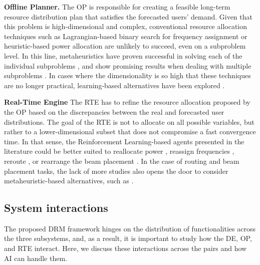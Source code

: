 \documentclass[letterpaper]{article} %
\begin{document}
\textbf{Offline Planner.} The OP is responsible for creating a feasible long-term resource distribution plan that satisfies the forecasted users' demand. Given that this problem is high-dimensional and complex, conventional resource allocation techniques such as Lagrangian-based binary search for frequency assignment \cite{park2012dynamic} or heuristic-based power allocation \cite{destounis2011dynamic} are unlikely to succeed, even on a subproblem level. In this line, metaheuristics have proven successful in solving each of the individual subproblems \cite{Deng2018, rao2011performance, tirmizi2015efficient, Durand2017}, and show promising results when dealing with multiple subproblems \cite{Camino2014, pachler20b, He2017}. In cases where the dimensionality is so high that these techniques are no longer practical, learning-based alternatives have been explored \cite{hu2020dynamic, gong2020adaptive, wangdynamic, Luis2019}.


\textbf{Real-Time Engine} The RTE has to refine the resource allocation proposed by the OP based on the discrepancies between the real and forecasted user distributions. The goal of the RTE is not to allocate on all possible variables, but rather to a lower-dimensional subset that does not compromise a fast convergence time. In that sense, the Reinforcement Learning-based agents presented in the literature could be better suited to reallocate power \cite{zhang2020online, liao2020distributed, Ferreira2018, Luis2019, Luis2020}, reassign frequencies \cite{liao2020distributed, zheng2020leo, Ferreira2018, Hu2018ASystems}, reroute \cite{gong2020adaptive}, or rearrange the beam placement \cite{hu2020dynamic}. In the case of routing and beam placement tasks, the lack of more studies also opens the door to consider metaheuristic-based alternatives, such as \cite{wangdynamic, Deng2018, He2017, Anzalchi2010, Angeletti2006, rao2011performance}.

\subsection{System interactions} \label{sec:4.4}

The proposed DRM framework hinges on the distribution of functionalities across the three subsystems, and, as a result, it is important to study how the DE, OP, and RTE interact. Here, we discuss these interactions across the pairs and how AI can handle them.
\end{document}
